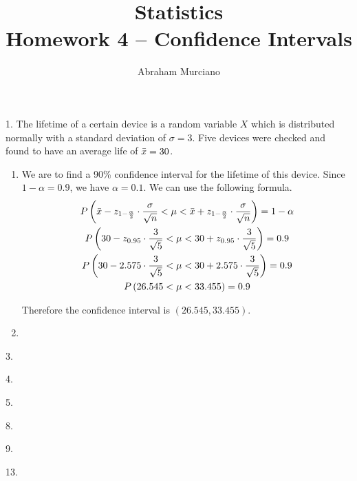 \documentclass[fleqn]{article}
\title{
	Statistics \\
	\medskip
	\large Homework 4 -- Confidence Intervals
}
\author{Abraham Murciano}
\begin{document}
\maketitle

\begin{answers}

	\item[1.]
		The lifetime of a certain device is a random variable \(X\) which is distributed normally with a standard deviation of \(\sigma = 3\). Five devices were checked and found to have an average life of \(\bar{x} = 30\).
		\begin{enumerate}
			\item %
				We are to find a 90\% confidence interval for the lifetime of this device. Since \(1 - \alpha = 0.9\), we have \(\alpha = 0.1\). We can use the following formula.
				\begin{gather*}
					P \left( \bar{x} - z_{1 - \frac{\alpha}{2}} \cdot \frac{\sigma}{\sqrt{n}} < \mu < \bar{x} + z_{1 - \frac{\alpha}{2}} \cdot \frac{\sigma}{\sqrt{n}} \right) = 1 - \alpha \\
					P \left( 30 - z_{0.95} \cdot \frac{3}{\sqrt{5}} < \mu < 30 + z_{0.95} \cdot \frac{3}{\sqrt{5}} \right) = 0.9 \\
					P \left( 30 - 2.575 \cdot \frac{3}{\sqrt{5}} < \mu < 30 + 2.575 \cdot \frac{3}{\sqrt{5}} \right) = 0.9 \\
					P \left( 26.545 < \mu < 33.455 \right) = 0.9
				\end{gather*}

				Therefore the confidence interval is \((26.545, 33.455)\).

			\item %
		\end{enumerate}

	\item[3.]


	\item[4.]


	\item[5.]


	\item[8.]


	\item[9.]


	\item[13.]

\end{answers}
\end{document}
